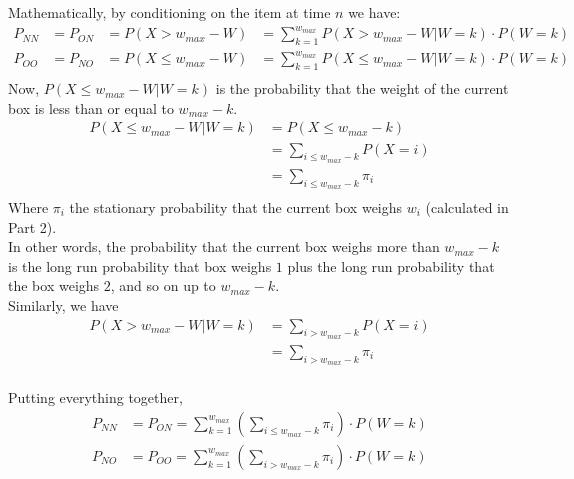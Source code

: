 \documentclass[10pt,a4paper]{article}
\begin{document}
Mathematically, by conditioning on the item at time $ n $ we have:\\
\begin{align*}
P_{NN} &= P_{ON} &= P(X > w_{max} -W) &= \sum\limits_{k=1}^{w_{max}} P(X > w_{max} -W | W=k)\cdot P(W=k)  \\
P_{OO} &= P_{NO} &= P(X \leq w_{max} -W) &=\sum\limits_{k=1}^{w_{max}} P(X \leq w_{max} -W | W=k)\cdot P(W=k) \\
\end{align*}
Now, $ P(X \leq w_{max} -W | W=k) $ is the probability that the weight of the current box is less than or equal to $ w_{max} - k $. \\
\begin{align*}
P(X \leq w_{max} - W| W=k) &= P(X \leq w_{max} -k)\\
&= \sum_{i \leq w_{max}-k} P(X = i) \\
&= \sum_{i \leq w_{max} - k} \pi_i \\
\end{align*}
Where $\pi_i$ the stationary probability that the current box weighs $w_i$ (calculated in Part 2). \\
In other words, the probability that the current box weighs more than $ w_{max} - k $ is the long run probability that box weighs $1$ plus the long run probability that the box weighs $2$, and so on up to $ w_{max} - k $. \\

Similarly, we have \\
\begin{align*}
P(X > w_{max} -W | W=k) &= \sum_{i > w_{max}-k} P(X = i)\\ 
&= \sum_{i > w_{max} -k} \pi_i \\
\end{align*}

Putting everything together, \\
\begin{align*}
P_{NN} &= P_{ON} = \sum\limits_{k=1}^{w_{max}} \left(\sum_{i \leq w_{max} -k} \pi_i \right) \cdot P(W=k)  \\
P_{NO} &= P_{OO} = \sum\limits_{k=1}^{w_{max}} \left(\sum_{i > w_{max} -k} \pi_i \right) \cdot P(W=k) \\
\end{align*}
\end{document}
